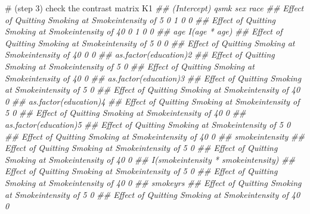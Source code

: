 \documentclass[
  10pt,
  a4paper,
]{book}
\newenvironment{Shaded}{\begin{snugshade}}{\end{snugshade}}
\newcommand{\CommentTok}[1]{\textcolor[rgb]{0.37,0.37,0.37}{#1}}
\newcommand{\DocumentationTok}[1]{\textcolor[rgb]{0.37,0.37,0.37}{\textit{#1}}}
\newcommand{\NormalTok}[1]{\textcolor[rgb]{0.00,0.46,0.62}{#1}}
\begin{document}
\begin{Shaded}
\begin{Highlighting}[]
\CommentTok{\# (step 3) check the contrast matrix}
\NormalTok{K1 }
\DocumentationTok{\#\#                                                    (Intercept) qsmk sex race}
\DocumentationTok{\#\# Effect of Quitting Smoking at Smokeintensity of 5            0    1   0    0}
\DocumentationTok{\#\# Effect of Quitting Smoking at Smokeintensity of 40           0    1   0    0}
\DocumentationTok{\#\#                                                    age I(age * age)}
\DocumentationTok{\#\# Effect of Quitting Smoking at Smokeintensity of 5    0            0}
\DocumentationTok{\#\# Effect of Quitting Smoking at Smokeintensity of 40   0            0}
\DocumentationTok{\#\#                                                    as.factor(education)2}
\DocumentationTok{\#\# Effect of Quitting Smoking at Smokeintensity of 5                      0}
\DocumentationTok{\#\# Effect of Quitting Smoking at Smokeintensity of 40                     0}
\DocumentationTok{\#\#                                                    as.factor(education)3}
\DocumentationTok{\#\# Effect of Quitting Smoking at Smokeintensity of 5                      0}
\DocumentationTok{\#\# Effect of Quitting Smoking at Smokeintensity of 40                     0}
\DocumentationTok{\#\#                                                    as.factor(education)4}
\DocumentationTok{\#\# Effect of Quitting Smoking at Smokeintensity of 5                      0}
\DocumentationTok{\#\# Effect of Quitting Smoking at Smokeintensity of 40                     0}
\DocumentationTok{\#\#                                                    as.factor(education)5}
\DocumentationTok{\#\# Effect of Quitting Smoking at Smokeintensity of 5                      0}
\DocumentationTok{\#\# Effect of Quitting Smoking at Smokeintensity of 40                     0}
\DocumentationTok{\#\#                                                    smokeintensity}
\DocumentationTok{\#\# Effect of Quitting Smoking at Smokeintensity of 5               0}
\DocumentationTok{\#\# Effect of Quitting Smoking at Smokeintensity of 40              0}
\DocumentationTok{\#\#                                                    I(smokeintensity * smokeintensity)}
\DocumentationTok{\#\# Effect of Quitting Smoking at Smokeintensity of 5                                   0}
\DocumentationTok{\#\# Effect of Quitting Smoking at Smokeintensity of 40                                  0}
\DocumentationTok{\#\#                                                    smokeyrs}
\DocumentationTok{\#\# Effect of Quitting Smoking at Smokeintensity of 5         0}
\DocumentationTok{\#\# Effect of Quitting Smoking at Smokeintensity of 40        0}

\end{Highlighting}
\end{Shaded}
\end{document}
